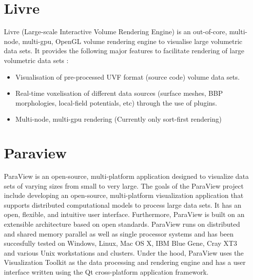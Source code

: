 \section{Livre}
\label{sec:livre}
Livre (Large-scale Interactive Volume Rendering Engine) is an out-of-core, multi-node, multi-gpu, OpenGL volume rendering engine to visualise large volumetric data sets.
It provides the following major features to facilitate rendering of large volumetric data sets \cite{livre}:
\begin{itemize}
    \item Visualisation of pre-processed UVF format (source code) volume data sets.
    \item Real-time voxelisation of different data sources (surface meshes, BBP morphologies, local-field potentials, etc) through the use of plugins.
    \item Multi-node, multi-gpu rendering (Currently only sort-first rendering)
\end{itemize}
\section{Paraview}
\label{sec:paraview}
ParaView is an open-source, multi-platform application designed to visualize data sets of varying sizes from small to very large. The goals of the ParaView project include developing an open-source, multi-platform visualization application that supports distributed computational models to process large data sets. It has an open, flexible, and intuitive user interface. Furthermore, ParaView is built on an extensible architecture based on open standards. ParaView runs on distributed and shared memory parallel as well as single processor systems and has been succesfully tested on Windows, Linux, Mac OS X, IBM Blue Gene, Cray XT3 and various Unix workstations and clusters. Under the hood, ParaView uses the Visualization Toolkit as the data processing and rendering engine and has a user interface written using the Qt cross-platform application framework. \cite{paraview}

